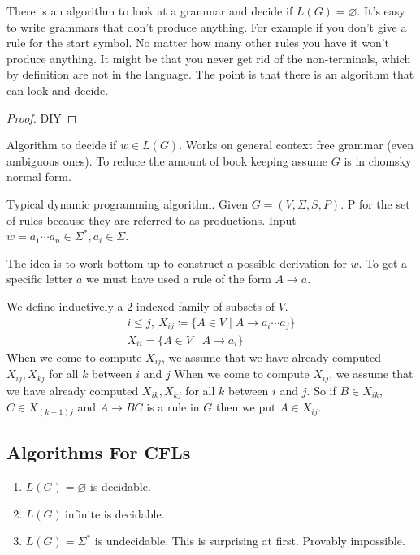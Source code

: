 \documentclass[../598comp.tex]{subfiles}
\begin{document}
\begin{fact}
  There is an algorithm to look at a grammar and decide if $L(G) = \varnothing$.
  It's easy to write grammars that don't produce anything. For example if you
  don't give a rule for the start symbol. No matter how many other rules you
  have it won't produce anything. It might be that you never get rid of the
  non-terminals, which by definition are not in the language. The point is that
  there is an algorithm that can look and decide.
  \begin{proof}
    DIY
  \end{proof}
\end{fact}

Algorithm to decide if $w \in L(G)$. Works on general context free grammar (even
ambiguous ones). To reduce the amount of book keeping assume $G$ is in chomsky normal form.

Typical dynamic programming algorithm. Given $G = (V, \Sigma, S, P)$. P for
the set of rules because they are referred to as productions. Input $w = a_1
\cdots a_n \in \Sigma^*, a_i \in \Sigma$. 

The idea is to work bottom up to construct a possible derivation for $w$. To get
a specific letter $a$ we must have used a rule of the form $A \to a$.

We define inductively a 2-indexed family of subsets of $V$. 
\begin{gather*}
  i \leq j, \ X_{ij} \coloneqq \{A \in V \mid A \to a_i \cdots a_j\} \\
  X_{ii} = \{A \in V \mid A \to a_i \}
\end{gather*}
When we come to compute $X_{ij}$, we assume that we have already computed
$X_{ij}, X_{kj}$ for all $k$ between $i$ and $j$
When we come to compute $X_{ij}$, we assume that we have already computed
$X_{ik}, X_{kj}$ for all $k$ between $i$ and $j$. So if $B \in X_{ik}$, $C \in
X_{(k + 1)j}$ and $A \to BC$ is a rule in $G$ then we put $A \in X_{ij}$.

\subsection{Algorithms For CFLs}
\begin{enumerate}
\item 
  $L(G) = \varnothing$ is decidable.
\item
  $L(G) \ \text{infinite}$  is decidable.
\item
  $L(G) = \Sigma^*$ is undecidable. This is surprising at first. Provably impossible.
\end{enumerate}
\end{document}
